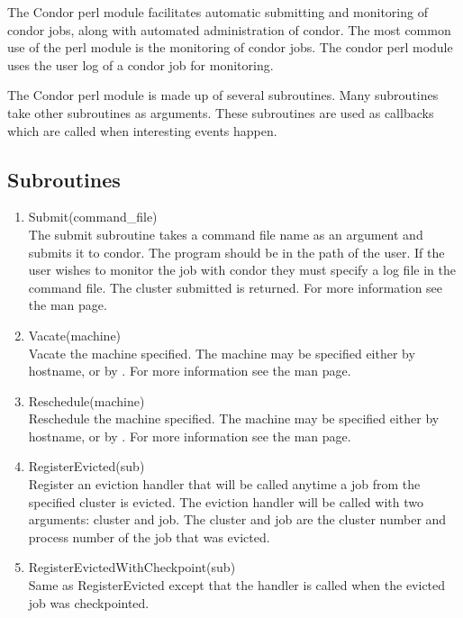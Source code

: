 The Condor perl module facilitates automatic submitting and monitoring of
condor jobs, along with automated administration of condor.  The most common
use of the perl module is the monitoring of condor jobs.  The condor perl
module uses the user log of a condor job for monitoring.

The Condor perl module is made up of several subroutines.  Many subroutines 
take other subroutines as arguments.  These subroutines are used as callbacks
which are called when interesting events happen.

\subsection{Subroutines}
\begin{enumerate}
	\item Submit(command\_file) \\
	The submit subroutine takes a command file name as an argument and
	submits it to condor.  The  program should be in the
	path of the user.  If the user wishes to monitor the job with condor
	they must specify a log file in the command file.  The cluster
	submitted is returned. For more information
	see the  man page.
	
	\item Vacate(machine) \\
	Vacate the machine specified.  The machine may be specified
	either by hostname, or by .  For more information
	see the  man page.

	\item Reschedule(machine) \\
	Reschedule the machine specified.  The machine may be specified either
 	by hostname, or by .  For more information see
	the  man page.

	\item RegisterEvicted(sub) \\
	Register an eviction handler that will be called anytime a job from
	the specified cluster is evicted.  The eviction handler will be
	called with two arguments: cluster and job. The cluster
	and job are the cluster number and process number of the job that
	was evicted.
	
	\item RegisterEvictedWithCheckpoint(sub) \\
	Same as RegisterEvicted except that the handler is called when the 
	evicted job was checkpointed.


\end{enumerate}
